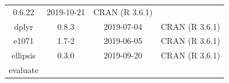 \documentclass[11pt,]{book}
\begin{document}
\begin{longtable}[]{@{}cccc@{}}
\begin{minipage}[t]{0.19\columnwidth}
0.6.22\strut
\end{minipage} & \begin{minipage}[t]{0.16\columnwidth}\centering\strut
2019-10-21\strut
\end{minipage} & \begin{minipage}[t]{0.36\columnwidth}\centering\strut
CRAN (R 3.6.1)\strut
\end{minipage}\tabularnewline
\begin{minipage}[t]{0.18\columnwidth}\centering\strut
dplyr\strut
\end{minipage} & \begin{minipage}[t]{0.19\columnwidth}\centering\strut
0.8.3\strut
\end{minipage} & \begin{minipage}[t]{0.16\columnwidth}\centering\strut
2019-07-04\strut
\end{minipage} & \begin{minipage}[t]{0.36\columnwidth}\centering\strut
CRAN (R 3.6.1)\strut
\end{minipage}\tabularnewline
\begin{minipage}[t]{0.18\columnwidth}\centering\strut
e1071\strut
\end{minipage} & \begin{minipage}[t]{0.19\columnwidth}\centering\strut
1.7-2\strut
\end{minipage} & \begin{minipage}[t]{0.16\columnwidth}\centering\strut
2019-06-05\strut
\end{minipage} & \begin{minipage}[t]{0.36\columnwidth}\centering\strut
CRAN (R 3.6.1)\strut
\end{minipage}\tabularnewline
\begin{minipage}[t]{0.18\columnwidth}\centering\strut
ellipsis\strut
\end{minipage} & \begin{minipage}[t]{0.19\columnwidth}\centering\strut
0.3.0\strut
\end{minipage} & \begin{minipage}[t]{0.16\columnwidth}\centering\strut
2019-09-20\strut
\end{minipage} & \begin{minipage}[t]{0.36\columnwidth}\centering\strut
CRAN (R 3.6.1)\strut
\end{minipage}\tabularnewline
\begin{minipage}[t]{0.18\columnwidth}\centering\strut
evaluate\strut
\end{minipage} & \begin{minipage}[t]{0.19\columnwidth}\centering\strut

\end{minipage}
\end{longtable}
\end{document}
